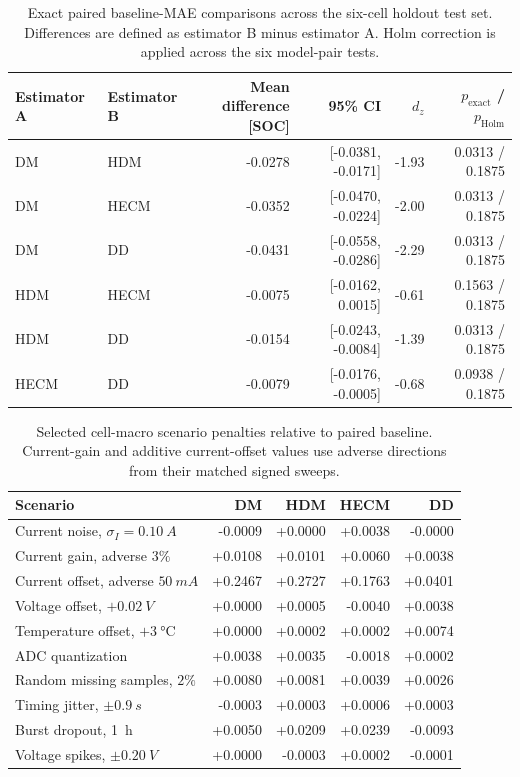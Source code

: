 \documentclass[review,nopreprintline]{elsarticle}
\begin{document}
\begin{table}[h]
\centering
\footnotesize
\setlength{\tabcolsep}{2pt}
\caption{Exact paired baseline-MAE comparisons across the six-cell holdout test set. Differences are defined as estimator B minus estimator A. Holm correction is applied across the six model-pair tests.}
\label{tab:appendix_baseline_pair_tests}
\begin{tabular}{llrrrr}
\toprule
Estimator A & Estimator B & \shortstack{Mean difference\\{[SOC]}} & 95\% CI & $d_z$ & \shortstack{$p_{\mathrm{exact}}$ /\\$p_{\mathrm{Holm}}$} \\
\midrule
DM   & HDM  & -0.0278 & [-0.0381, -0.0171] & -1.93 & 0.0313 / 0.1875 \\
DM   & HECM & -0.0352 & [-0.0470, -0.0224] & -2.00 & 0.0313 / 0.1875 \\
DM   & DD   & -0.0431 & [-0.0558, -0.0286] & -2.29 & 0.0313 / 0.1875 \\
HDM  & HECM & -0.0075 & [-0.0162,  0.0015] & -0.61 & 0.1563 / 0.1875 \\
HDM  & DD   & -0.0154 & [-0.0243, -0.0084] & -1.39 & 0.0313 / 0.1875 \\
HECM & DD   & -0.0079 & [-0.0176, -0.0005] & -0.68 & 0.0938 / 0.1875 \\
\bottomrule
\end{tabular}
\end{table}

\begin{table}[h]
\centering
\footnotesize
\caption{Selected cell-macro scenario penalties relative to paired baseline. Current-gain and additive current-offset values use adverse directions from their matched signed sweeps.}
\label{tab:appendix_key_results}
\begin{tabular}{lrrrr}
\toprule
Scenario & DM & HDM & HECM & DD \\
\midrule
Current noise, $\sigma_I=\SI{0.10}{A}$ & -0.0009 & +0.0000 & +0.0038 & -0.0000 \\
Current gain, adverse $3\%$ & +0.0108 & +0.0101 & +0.0060 & +0.0038 \\
Current offset, adverse $\SI{50}{mA}$ & +0.2467 & +0.2727 & +0.1763 & +0.0401 \\
Voltage offset, $+\SI{0.02}{V}$ & +0.0000 & +0.0005 & -0.0040 & +0.0038 \\
Temperature offset, $+\SI{3}{\celsius}$ & +0.0000 & +0.0002 & +0.0002 & +0.0074 \\
ADC quantization & +0.0038 & +0.0035 & -0.0018 & +0.0002 \\
Random missing samples, $2\%$ & +0.0080 & +0.0081 & +0.0039 & +0.0026 \\
Timing jitter, $\pm\SI{0.9}{s}$ & -0.0003 & +0.0003 & +0.0006 & +0.0003 \\
Burst dropout, \SI{1}{h} & +0.0050 & +0.0209 & +0.0239 & -0.0093 \\
Voltage spikes, $\pm\SI{0.20}{V}$ & +0.0000 & -0.0003 & +0.0002 & -0.0001 \\
\bottomrule
\end{tabular}
\end{table}
\end{document}
